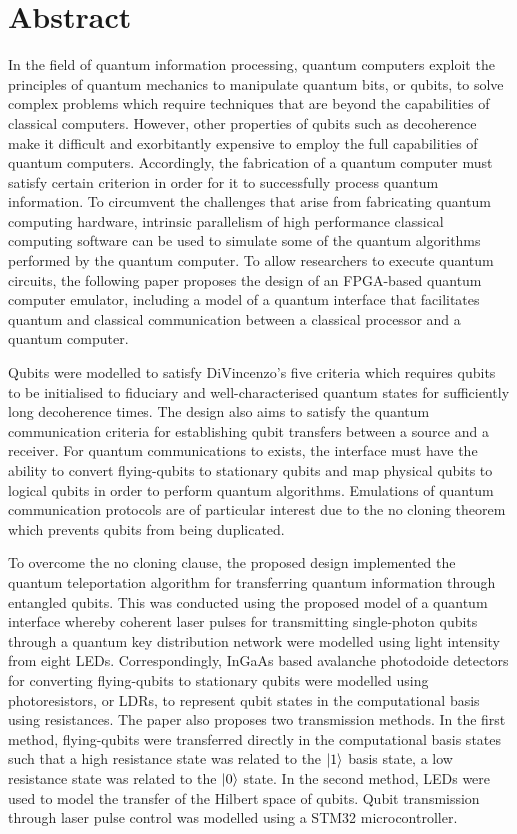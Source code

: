 \chapter*{Abstract}

In the field of quantum information processing, quantum computers exploit the principles of quantum mechanics to manipulate quantum bits, or qubits, to solve complex problems which require techniques that are beyond the capabilities of classical computers. However, other properties of qubits such as decoherence make it difficult and exorbitantly expensive to employ the full capabilities of quantum computers. Accordingly, the fabrication of a quantum computer must satisfy certain criterion in order for it to successfully process quantum information. To circumvent the challenges that arise from fabricating quantum computing hardware, intrinsic parallelism of high performance classical computing software can be used to simulate some of the quantum algorithms performed by the quantum computer. To allow researchers to execute quantum circuits, the following paper proposes the design of an FPGA-based quantum computer emulator, including a model of a quantum interface that facilitates quantum and classical communication between a classical processor and a quantum computer. 

Qubits were modelled to satisfy DiVincenzo's five criteria which requires qubits to be initialised to fiduciary and well-characterised quantum states for sufficiently long decoherence times. The design also aims to satisfy the quantum communication criteria for establishing qubit transfers between a source and a receiver. For quantum communications to exists, the interface must have the ability to convert flying-qubits to stationary qubits and map physical qubits to logical qubits in order to perform quantum algorithms. Emulations of quantum communication protocols are of particular interest due to the no cloning theorem which prevents qubits from being duplicated. 

To overcome the no cloning clause, the proposed design implemented the quantum teleportation algorithm for transferring quantum information through entangled qubits. This was conducted using the proposed model of a quantum interface whereby coherent laser pulses for transmitting single-photon qubits through a quantum key distribution network were modelled using light intensity from eight LEDs. Correspondingly, InGaAs  based avalanche photodoide detectors for converting flying-qubits to stationary qubits were modelled using photoresistors, or LDRs, to represent qubit states in the computational basis using resistances. The paper also proposes two transmission methods. In the first method, flying-qubits were transferred directly in the computational basis states such that a high resistance state was related to the $\ket{1}$ basis state, a low resistance state was related to the $\ket{0}$ state. In the second method, LEDs were used to model the transfer of the Hilbert space of qubits. Qubit transmission through laser pulse control was modelled using a STM32 microcontroller.

